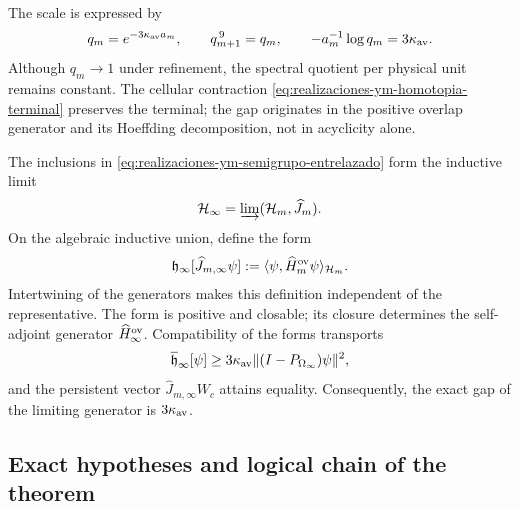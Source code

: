 The scale is expressed by
\begin{equation}\label{eq:realizaciones-ym-qm}
 q_m=e^{-3\kappa_{\rm av}a_m},
 \qquad q_{m+1}^{\,9}=q_m,
 \qquad -a_m^{-1}\log q_m=3\kappa_{\rm av}.
\end{equation}
Although \(q_m\to1\) under refinement, the spectral quotient per physical unit
remains constant. The cellular contraction
\eqref{eq:realizaciones-ym-homotopia-terminal} preserves the terminal; the
gap originates in the positive overlap generator and its Hoeffding
decomposition, not in acyclicity alone.

The inclusions in \eqref{eq:realizaciones-ym-semigrupo-entrelazado}
form the inductive limit
\begin{equation}\label{eq:realizaciones-ym-colimite}
 \mathcal H_\infty=\varinjlim(\mathcal H_m,\widehat J_m).
\end{equation}
On the algebraic inductive union, define the form
\begin{equation}\label{eq:realizaciones-ym-forma-limite}
 \mathfrak h_\infty[\widehat J_{m,\infty}\psi]
 :=\langle\psi,\widehat H_m^{\rm ov}\psi\rangle_{\mathcal H_m}.
\end{equation}
Intertwining of the generators makes this definition
independent of the representative. The form is positive and closable; its
closure determines the self-adjoint generator \(\widehat H_\infty^{\rm ov}\).
Compatibility of the forms transports
\begin{equation}\label{eq:realizaciones-ym-gap-forma-limite}
 \overline{\mathfrak h}_\infty[\psi]
 \geq3\kappa_{\rm av}
 \|(I-P_{\Omega_\infty})\psi\|^2,
\end{equation}
and the persistent vector
\(\widehat J_{m,\infty}W_c\) attains equality. Consequently, the
exact gap of the limiting generator is \(3\kappa_{\rm av}\).

\subsection*{Exact hypotheses and logical chain of the theorem}

